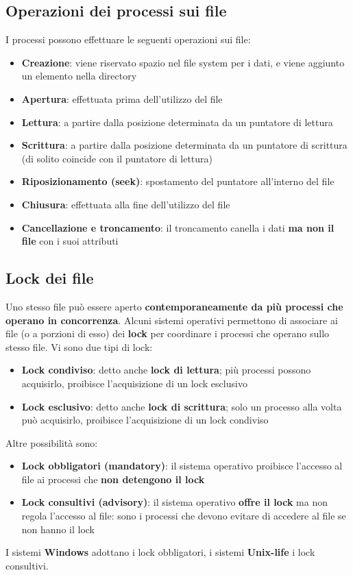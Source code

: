\documentclass[12pt]{article}
\begin{document}
\subsection{Operazioni dei processi sui file}
I processi possono effettuare le seguenti operazioni sui file:
\begin{itemize}
    \item \textbf{Creazione}: viene riservato spazio nel file system per i dati, e viene aggiunto un elemento nella directory
    \item \textbf{Apertura}: effettuata prima dell'utilizzo del file
    \item \textbf{Lettura}: a partire dalla posizione determinata da un puntatore di lettura
    \item \textbf{Scrittura}: a partire dalla posizione determinata da un puntatore di scrittura (di solito coincide con il puntatore di lettura)
    \item \textbf{Riposizionamento (seek)}: spostamento del puntatore all'interno del file
    \item \textbf{Chiusura}: effettuata alla fine dell'utilizzo del file
    \item \textbf{Cancellazione e troncamento}: il troncamento canella i dati \textbf{ma non il file} con i suoi attributi
\end{itemize}
\subsection{Lock dei file}
Uno stesso file può essere aperto \textbf{contemporaneamente da più processi che operano in concorrenza}.
Alcuni sistemi operativi permettono di associare ai file (o a porzioni di esso) dei \textbf{lock} per coordinare i processi che operano sullo stesso file.
Vi sono due tipi di lock:
\begin{itemize}
    \item \textbf{Lock condiviso}: detto anche \textbf{lock di lettura}; più processi possono acquisirlo, proibisce l'acquisizione di un lock esclusivo
    \item \textbf{Lock esclusivo}: detto anche \textbf{lock di scrittura}; solo un processo alla volta può acquisirlo, proibisce l'acquisizione di un lock condiviso
\end{itemize}
Altre possibilità sono:
\begin{itemize}
    \item \textbf{Lock obbligatori (mandatory)}: il sistema operativo proibisce l'accesso al file ai processi che \textbf{non detengono il lock}
    \item \textbf{Lock consultivi (advisory)}: il sistema operativo \textbf{offre il lock} ma non regola l'accesso al file: sono i processi che devono evitare di accedere al file se non hanno il lock
\end{itemize}
I sistemi \textbf{Windows} adottano i lock obbligatori, i sistemi \textbf{Unix-life} i lock consultivi.
\end{document}
